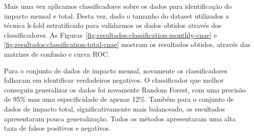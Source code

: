 Mais uma vez aplicamos classificadores sobre os dados para identificação do impacto mensal e total. Desta vez, dado o tamanho do dataset utilizados a técnica k-fold estratificado para validarmos os dados obtidos através dos classificadores. As Figuras~\ref{fig:resultados:classification-monthly-cnae} e \ref{fig:resultados:classification-total-cnae} mostram os resultados obtidos, através das matrizes de confusão e curva ROC.

Para o conjunto de dados de impacto mensal, novamente os classificadores falharam em identificar verdadeiros negativos. O classificador que melhor conseguiu generalizar os dados foi novamente Random Forest, com uma precisão de 95\% mas uma especificidade de apenas 12\%. Também para o conjunto de dados de impacto total, significativamente mais balanceado, os resultados apresentaram pouca generalização. Todos os métodos apresentaram uma alta taxa de falsos positivos e negativos.

